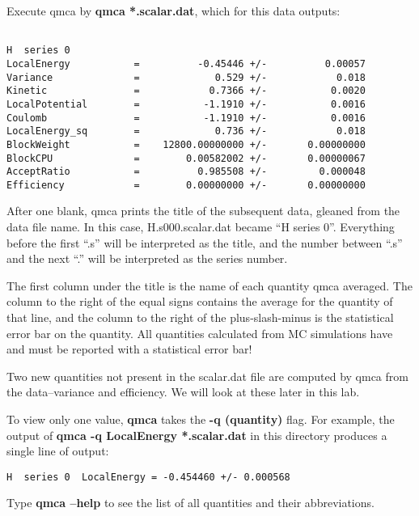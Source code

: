 Execute qmca by \textbf{qmca *.scalar.dat}, which for this data outputs:

\begin{shaded} 
\begin{verbatim}

H  series 0 
LocalEnergy           =          -0.45446 +/-          0.00057
Variance              =             0.529 +/-            0.018 
Kinetic               =            0.7366 +/-           0.0020
LocalPotential        =           -1.1910 +/-           0.0016
Coulomb               =           -1.1910 +/-           0.0016 
LocalEnergy_sq        =             0.736 +/-            0.018
BlockWeight           =    12800.00000000 +/-       0.00000000
BlockCPU              =        0.00582002 +/-       0.00000067 
AcceptRatio           =          0.985508 +/-         0.000048
Efficiency            =        0.00000000 +/-       0.00000000 
\end{verbatim} 
\end{shaded}

After one blank, qmca prints the title of the subsequent data, gleaned from the
data file name.  In this case, H.s000.scalar.dat became ``H  series 0''.
Everything before the first ``.s'' will be interpreted as the title, and the
number between ``.s'' and the next ``.'' will be interpreted as the series
number. 

The first column under the title is the name of each quantity qmca averaged.
The column to the right of the equal signs contains the average for the
quantity of that line, and the column to the right of the plus-slash-minus is
the statistical error bar on the quantity.  All quantities calculated from MC
simulations have and must be reported with a statistical error bar!

Two new quantities not present in the scalar.dat file are computed by qmca from
the data--variance and efficiency.  We will look at these later in this lab. 

To view only one value, \textbf{qmca} takes the \textbf{-q (quantity)} flag.
For example, the output of \textbf{qmca -q LocalEnergy *.scalar.dat} in this
directory produces a single line of output:

\begin{shaded} 
\begin{verbatim} 
H  series 0  LocalEnergy = -0.454460 +/- 0.000568 
\end{verbatim} 
\end{shaded}

Type \textbf{qmca --help} to see the list of all quantities and their
abbreviations.

